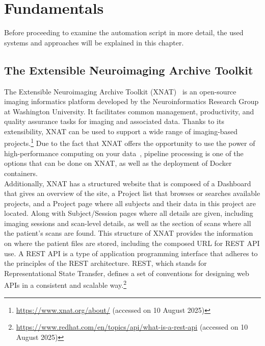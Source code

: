 
\chapter{Fundamentals}

Before proceeding to examine the automation script in more detail, the used systems and approaches will be explained in this chapter.

\section{The Extensible Neuroimaging Archive Toolkit}
The Extensible Neuroimaging Archive Toolkit (XNAT)~\cite{marcus_extensible_2007} is an open-source imaging informatics platform developed by the Neuroinformatics Research Group at Washington University. It facilitates common management, productivity, and quality assurance tasks for imaging and associated data. Thanks to its extensibility, XNAT can be used to support a wide range of imaging-based projects.\footnote{\url{https://www.xnat.org/about/} (accessed on 10 August 2025)} Due to the fact that XNAT offers the opportunity to use the power of high-performance computing on your data~\cite{zaschke_extending_2024}, 
pipeline processing is one of the options that can be done on XNAT, as well as the deployment of Docker containers.
\\
Additionally, XNAT has a structured website that is composed of a Dashboard that gives an overview of the site, a Project list that browses or searches available projects, and a Project page where all subjects and their data in this project are located. Along with Subject/Session pages where all details are given, including imaging sessions and scan-level details, as well as the section of scans where all the patient’s scans are found. 
This structure of XNAT provides the information on where the patient files are stored, including the composed URL for REST API use. A REST API is a type of application programming interface that adheres to the principles of the REST architecture. REST, which stands for Representational State Transfer, defines a set of conventions for designing web APIs in a consistent and scalable way.\footnote{\url{https://www.redhat.com/en/topics/api/what-is-a-rest-api} (accessed on 10 August 2025)}
\\

